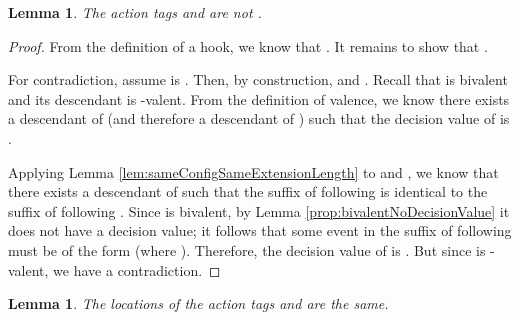\documentclass[11pt]{article}
\numberwithin{theorem}{section}
\newtheorem{lemma}[theorem]{Lemma}
\begin{document}
\begin{lemma}\label{thm:hookEventTagsNotBot}
The action tags  and  are not .
\end{lemma}
\begin{proof} 
From the definition of a hook, we know that . It remains to show that .

For contradiction, assume  is .
Then, by construction,  and . Recall that  is bivalent and its descendant  is -valent. From the definition of valence, we know there exists a descendant  of  (and therefore a descendant of ) such that the decision value of  is .

 Applying Lemma \ref{lem:sameConfigSameExtensionLength} to  and , we know that there exists a descendant  of  such that the suffix of  following  is identical to the suffix of  following . Since   is bivalent, by Lemma \ref{prop:bivalentNoDecisionValue} it does not have a decision value; it follows that some event in the suffix of  following  must be of the form  (where ). Therefore, the decision value of  is . But since  is -valent, we have a contradiction. 
\end{proof}

\begin{lemma}\label{thm:sameCriticalProcess}
The locations of the action tags  and  are the same.
\end{lemma}
\end{document}
